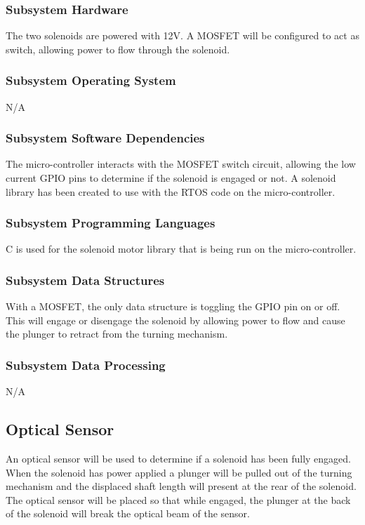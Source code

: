 \subsubsection{Subsystem Hardware}
The two solenoids are powered with 12V. A MOSFET will be configured to act as switch, allowing power to flow through the solenoid.

\subsubsection{Subsystem Operating System}
N/A

\subsubsection{Subsystem Software Dependencies}
The micro-controller interacts with the MOSFET switch circuit, allowing the low current GPIO pins to determine if the solenoid is engaged or not. A solenoid library has been created to use with the RTOS code on the micro-controller.

\subsubsection{Subsystem Programming Languages}
C is used for the solenoid motor library that is being run on the micro-controller.

\subsubsection{Subsystem Data Structures}
With a MOSFET, the only data structure is toggling the GPIO pin on or off. This will engage or disengage the solenoid by allowing power to flow and cause the plunger to retract from the turning mechanism.

\subsubsection{Subsystem Data Processing}
N/A

\subsection{Optical Sensor}
An optical sensor will be used to determine if a solenoid has been fully engaged. When the solenoid has power applied a plunger will be pulled out of the turning mechanism and the displaced shaft length will present at the rear of the solenoid. The optical sensor will be placed so that while engaged, the plunger at the back of the solenoid will break the optical beam of the sensor.


